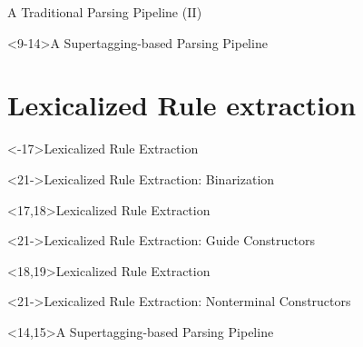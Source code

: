 \documentclass[aspectratio=169, 10pt]{beamer}
\begin{document}
    \begin{frame}{A Traditional Parsing Pipeline (II)}
        \centering
        
    \end{frame}

    \begin{frame}<9-14>{A Supertagging-based Parsing Pipeline \citep{bangalore1999supertagging}}
        \resizebox{\linewidth}{!}{}
    \end{frame}


    \section{Lexicalized Rule extraction}
    \begin{frame}<-17>{Lexicalized Rule Extraction \citep{Rup22}}
        \resizebox{\linewidth}{!}{}
    \end{frame}

    \begin{frame}<21->{Lexicalized Rule Extraction: Binarization \citep{KalMai13}}
        \resizebox{\linewidth}{!}{}
    \end{frame}

    \begin{frame}<17,18>{Lexicalized Rule Extraction}
    \resizebox{\linewidth}{!}{}
    \end{frame}

    \begin{frame}<21->{Lexicalized Rule Extraction: Guide Constructors}
        \centering
        \resizebox{!}{.9\textheight}{}
    \end{frame}

    \begin{frame}<18,19>{Lexicalized Rule Extraction}
        \resizebox{\linewidth}{!}{}
    \end{frame}

    \begin{frame}<21->{Lexicalized Rule Extraction: Nonterminal Constructors}
        \resizebox{\linewidth}{!}{}
    \end{frame}


    \begin{frame}<14,15>{A Supertagging-based Parsing Pipeline}
        \resizebox{\linewidth}{!}{}
    \end{frame}
\end{document}
